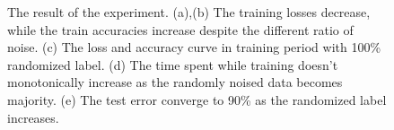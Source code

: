 \documentclass[10pt]{article}
\begin{document}
\begin{figure}[!h]
\begin{center}
{        }
    \end{center}
    \caption{The result of the experiment. (a),(b) The training losses decrease, while the train accuracies increase despite the different ratio of noise. (c) The loss and accuracy curve in training period with 100\% randomized label. (d) The time spent while training doesn't monotonically increase as the randomly noised data becomes majority. (e) The test error converge to 90\% as the randomized label increases.}
    \label{fig4}
\end{figure}
\end{document}
